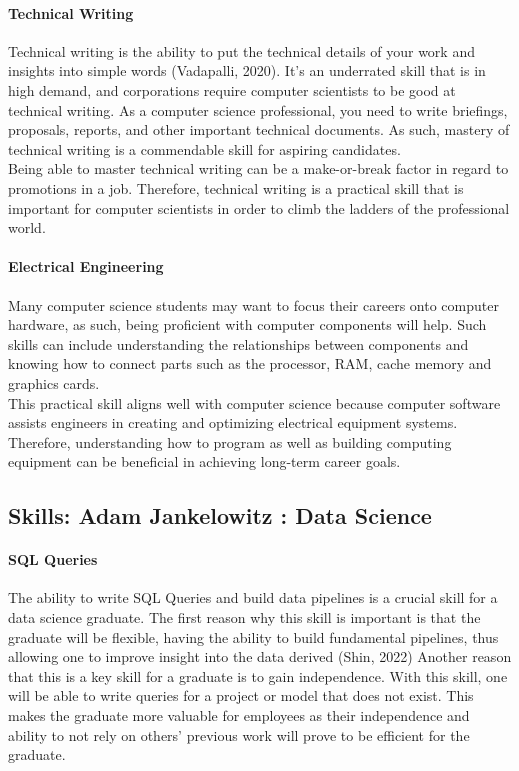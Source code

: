 \documentclass[a4paper, 11pt]{report}
\begin{document}
	\paragraph{Technical Writing} Technical writing is the ability to put the technical details of your work and insights into simple words (Vadapalli, 2020).  It’s an underrated skill that is in high demand, and corporations require computer scientists to be good at technical writing. As a computer science professional, you need to write briefings, proposals, reports, and other important technical documents. As such, mastery of technical writing is a commendable skill for aspiring candidates. 
	\\ Being able to master technical writing can be a make-or-break factor in regard to promotions in a job. Therefore, technical writing is a practical skill that is important for computer scientists in order to climb the ladders of the professional world. 
	
	\paragraph{Electrical Engineering} Many computer science students may want to focus their careers onto computer hardware, as such, being proficient with computer components will help. Such skills can include understanding the relationships between components and knowing how to connect parts such as the processor, RAM, cache memory and graphics cards. 
	\\ This practical skill aligns well with computer science because computer software assists engineers in creating and optimizing electrical equipment systems. Therefore, understanding how to program as well as building computing equipment can be beneficial in achieving long-term career goals.
	
	
	
	\subsection{Skills: Adam Jankelowitz : Data Science}
	
	\paragraph{SQL Queries}
	The ability to write SQL Queries and build data pipelines is a crucial skill for a data science graduate. The first reason why this skill is important is that the graduate will be flexible, having the ability to build fundamental pipelines, thus allowing one to improve insight into the data derived (Shin, 2022) Another reason that this is a key skill for a graduate is to gain independence. With this skill, one will be able to write queries for a project or model that does not exist. This makes the graduate more valuable for employees as their independence and ability to not rely on others’ previous work will prove to be efficient for the graduate.
	
\end{document}
